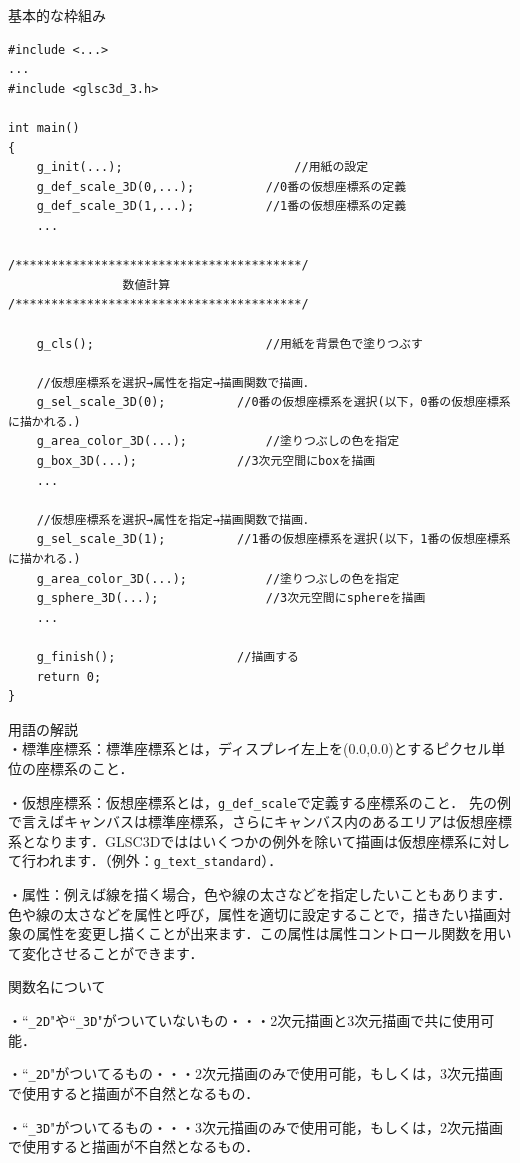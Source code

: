 \documentclass[platex,a4paper,12pt]{jsarticle}%
\begin{document}
\newpage
基本的な枠組み
\begin{verbatim}
#include <...>
...
#include <glsc3d_3.h>

int main()
{
    g_init(...);						//用紙の設定
    g_def_scale_3D(0,...);			//0番の仮想座標系の定義
    g_def_scale_3D(1,...);			//1番の仮想座標系の定義
    ...
        
/****************************************/	
                数値計算
/****************************************/

    g_cls();						//用紙を背景色で塗りつぶす
   
    //仮想座標系を選択→属性を指定→描画関数で描画．
    g_sel_scale_3D(0);			//0番の仮想座標系を選択(以下，0番の仮想座標系に描かれる．)	
    g_area_color_3D(...);			//塗りつぶしの色を指定
    g_box_3D(...);				//3次元空間にboxを描画
    ...
    
    //仮想座標系を選択→属性を指定→描画関数で描画．
    g_sel_scale_3D(1);			//1番の仮想座標系を選択(以下，1番の仮想座標系に描かれる．)
    g_area_color_3D(...);			//塗りつぶしの色を指定
    g_sphere_3D(...);				//3次元空間にsphereを描画
    ...
           
    g_finish();					//描画する
    return 0;
}

\end{verbatim}
用語の解説\\
\noindent
・標準座標系：標準座標系とは，ディスプレイ左上を(0.0,0.0)とするピクセル単位の座標系のこと．

\noindent
・仮想座標系：仮想座標系とは，\verb|g_def_scale|で定義する座標系のこと．
先の例で言えばキャンバスは標準座標系，さらにキャンバス内のあるエリアは仮想座標系となります．GLSC3Dでははいくつかの例外を除いて描画は仮想座標系に対して行われます．（例外：\verb|g_text_standard|）．

\noindent
・属性：例えば線を描く場合，色や線の太さなどを指定したいこともあります．色や線の太さなどを属性と呼び，属性を適切に設定することで，描きたい描画対象の属性を変更し描くことが出来ます．この属性は属性コントロール関数を用いて変化させることができます．

\vspace{5mm}
\noindent
関数名について

\noindent
・``\verb|_2D|"や``\verb|_3D|"がついていないもの・・・2次元描画と3次元描画で共に使用可能．

\noindent
・``\verb|_2D|"がついてるもの・・・2次元描画のみで使用可能，もしくは，3次元描画で使用すると描画が不自然となるもの．

\noindent
・``\verb|_3D|"がついてるもの・・・3次元描画のみで使用可能，もしくは，2次元描画で使用すると描画が不自然となるもの．
\end{document}

